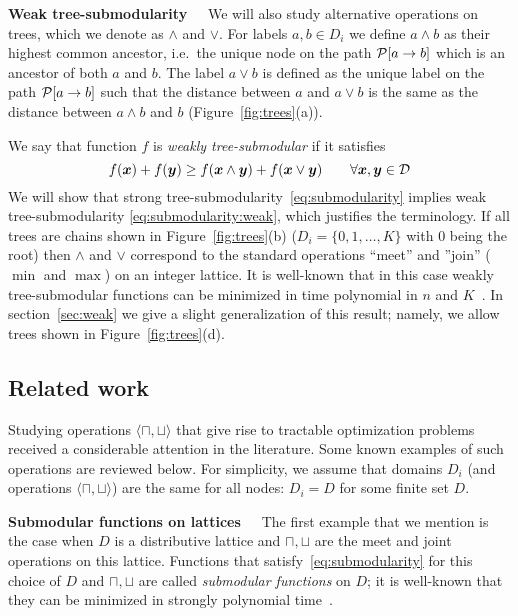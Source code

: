 \documentclass[11pt,onecolumn]{article}
\newcommand{\myparagraph}[1]{{\vspace*{2pt}\noindent\bf{#1}~~}}
\def\D{{\cal D}}
\def\calP{{\cal P}}
\newcommand{\bx}{\mbox{\boldmath $x$}}
\newcommand{\by}{\mbox{\boldmath $y$}}
\begin{document}
\myparagraph{Weak tree-submodularity} We will also study alternative operations on trees, which we denote as $\wedge$ and $\vee$.
For labels $a,b\in D_i$ we define $a\wedge b$ as their highest common ancestor, i.e.\ the unique node on the path $\calP[a\rightarrow b]$
which is an ancestor of both $a$ and $b$. The label $a\vee b$ is defined as the unique label on the path $\calP[a\rightarrow b]$
such that the distance between $a$ and $a\vee b$ is the same as the distance between $a\wedge b$ and $b$ (Figure~\ref{fig:trees}(a)).

We say that function $f$ is {\em weakly tree-submodular} if it satisfies
\begin{equation}
f(\bx)+f(\by)\ge f(\bx \wedge \by) + f(\bx \vee \by) \qquad \forall \bx,\by\in \D
\label{eq:submodularity:weak}
\end{equation}
We will show that strong tree-submodularity~\eqref{eq:submodularity} implies weak tree-submodularity \eqref{eq:submodularity:weak},
which justifies the terminology. If all trees are chains shown in Figure~\ref{fig:trees}(b) ($D_i=\{0,1,\ldots,K\}$ with $0$ being the root)
then $\wedge$ and $\vee$ correspond to the standard operations ``meet'' and ''join'' ($\min$ and $\max$) on an integer lattice.
It is well-known that in this case weakly tree-submodular functions can be minimized in time polynomial in $n$ and $K$~\cite{Topkis:78,Murota:book}.
In section~\ref{sec:weak} we give a slight generalization of this result; namely, we allow trees shown in Figure~\ref{fig:trees}(d).



\subsection{Related work} 
Studying operations $\langle\sqcap,\sqcup\rangle$ that give rise to tractable optimization problems received a considerable attention in the literature. Some known examples of
such operations are reviewed below. For simplicity, we assume that domains $D_i$ (and operations $\langle\sqcap,\sqcup\rangle$) are the same for all nodes:
$D_i=D$ for some finite set $D$.


\myparagraph{Submodular functions on lattices} 
The first example that we mention is the case when $D$ is a distributive lattice and $\sqcap,\sqcup$ 
are the meet and joint operations on this lattice. Functions that satisfy~\eqref{eq:submodularity} for this choice of $D$ and $\sqcap,\sqcup$ 
are called {\em submodular functions} on $D$; it is well-known that they can be minimized in strongly polynomial time~\cite{Grotschel:88,Schrijver:00,Iwata:01}.
\end{document}
